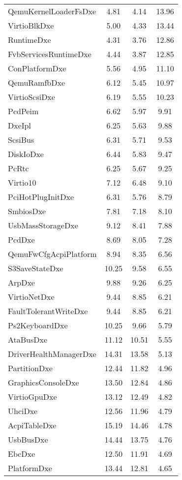 \begin{longtable}{l c c c}
  QemuKernelLoaderFsDxe & 4.81 & 4.14 & 13.96\\
  VirtioBlkDxe & 5.00 & 4.33 & 13.44\\
  RuntimeDxe & 4.31 & 3.76 & 12.86\\
  FvbServicesRuntimeDxe & 4.44 & 3.87 & 12.85\\
  ConPlatformDxe & 5.56 & 4.95 & 11.10\\
  QemuRamfbDxe & 6.12 & 5.45 & 10.97\\
  VirtioScsiDxe & 6.19 & 5.55 & 10.23\\
  PcdPeim & 6.62 & 5.97 & 9.91\\
  DxeIpl & 6.25 & 5.63 & 9.88\\
  ScsiBus & 6.31 & 5.71 & 9.53\\
  DiskIoDxe & 6.44 & 5.83 & 9.47\\
  PcRtc & 6.25 & 5.67 & 9.25\\
  Virtio10 & 7.12 & 6.48 & 9.10\\
  PciHotPlugInitDxe & 6.31 & 5.76 & 8.79\\
  SmbiosDxe & 7.81 & 7.18 & 8.10\\
  UsbMassStorageDxe & 9.12 & 8.41 & 7.88\\
  PcdDxe & 8.69 & 8.05 & 7.28\\
  QemuFwCfgAcpiPlatform & 8.94 & 8.35 & 6.56\\
  S3SaveStateDxe & 10.25 & 9.58 & 6.55\\
  ArpDxe & 9.88 & 9.26 & 6.25\\
  VirtioNetDxe & 9.44 & 8.85 & 6.21\\
  FaultTolerantWriteDxe & 9.44 & 8.85 & 6.21\\
  Ps2KeyboardDxe & 10.25 & 9.66 & 5.79\\
  AtaBusDxe & 11.12 & 10.51 & 5.55\\
  DriverHealthManagerDxe & 14.31 & 13.58 & 5.13\\
  PartitionDxe & 12.44 & 11.82 & 4.96\\
  GraphicsConsoleDxe & 13.50 & 12.84 & 4.86\\
  VirtioGpuDxe & 13.12 & 12.49 & 4.82\\
  UhciDxe & 12.56 & 11.96 & 4.79\\
  AcpiTableDxe & 15.19 & 14.46 & 4.78\\
  UsbBusDxe & 14.44 & 13.75 & 4.76\\
  EbcDxe & 12.50 & 11.91 & 4.69\\
  PlatformDxe & 13.44 & 12.81 & 4.65\\

\end{longtable}
